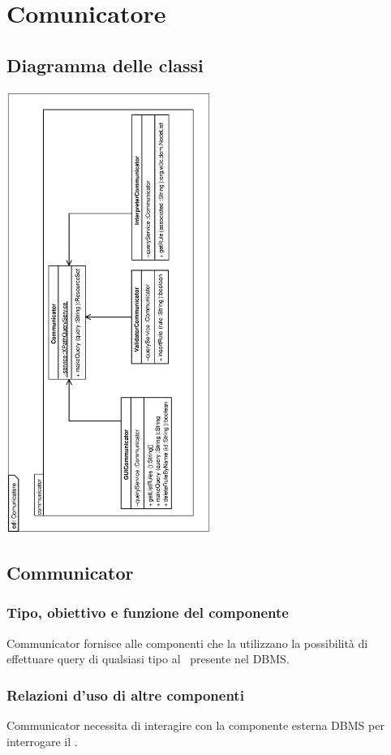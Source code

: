 \documentclass[11pt,titlepage,a4paper]{report}
\begin{document}
\section{Comunicatore}
\subsection{Diagramma delle classi}
\begin{center}
\includegraphics[width=0.5\textwidth, angle=-90]{DiagrammaClassi/Comunicatore.eps}
\end{center}
\subsection{Communicator}
\subsubsection{Tipo, obiettivo e funzione del componente}
Communicator fornisce alle componenti che la utilizzano la possibilit\`a di effettuare query di qualsiasi tipo al \re\ presente nel DBMS.
\subsubsection{Relazioni d'uso di altre componenti}
Communicator necessita di interagire con la componente esterna DBMS per interrogare il \re.
\end{document}
